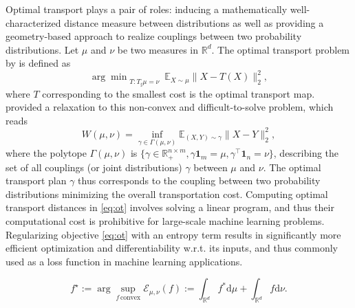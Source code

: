 Optimal transport plays a pair of roles: inducing a mathematically well-characterized distance measure between distributions as well as providing a geometry-based approach to realize couplings between two probability distributions.
Let $\mu$ and $\nu$ be two measures in $\mathbb{R}^d$. 
The optimal transport problem by \citet{monge1781histoire} is defined as
\begin{equation}\label{eq:monge}
    {\arg \min}_{T : T_\sharp \mu = \nu} \enspace \mathbb{E}_{X \sim \mu}\|X-T(X)\|^2_2,
\end{equation}
where $T$ corresponding to the smallest cost is the optimal transport map.
\citet{kantorovich1942transfer} provided a relaxation to this non-convex and difficult-to-solve problem, which reads
\begin{equation}\label{eq:ot}
W(\mu, \nu)= \inf _{\gamma \in \Gamma(\mu, \nu)} \mathbb{E}_{(X, Y) \sim \gamma}\|X-Y\|^2_2,
\end{equation}
where the polytope $\Gamma(\mu, \nu)$ is $\{\gamma \in\mathbb{R}^{n \times m}_+, \gamma\mathbf{1}_m =\mu, \gamma^\top\mathbf{1}_n=\nu\}$, describing the set of all couplings (or joint distributions) $\gamma$ between $\mu$ and $\nu$.
The optimal transport plan $\gamma$ thus corresponds to the coupling between two probability distributions minimizing the overall transportation cost. 
Computing optimal transport distances in \eqref{eq:ot} involves solving a linear program, and thus their computational cost is prohibitive for large-scale machine learning problems. Regularizing objective \eqref{eq:ot} with an entropy term results in significantly more efficient optimization \citep{cuturi2013sinkhorn} and differentiability w.r.t. its inputs, and thus commonly used
as a loss function in machine learning applications.

\begin{equation}\label{eq:dual}
f^\star:=\arg\!\!\sup_{f\,\text{convex}}\mathcal{E}_{\mu,\nu}(f):=\int_{\mathbb{R}^d}f^*\textrm{d}\mu+\int_{\mathbb{R}^d}f\textrm{d}\nu.
\end{equation}


